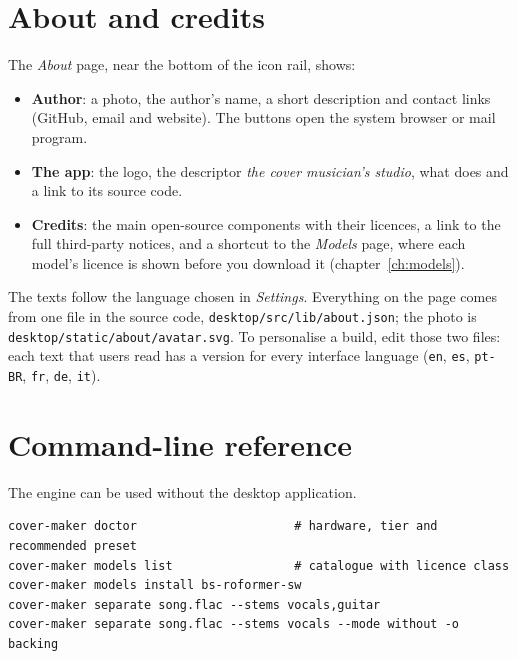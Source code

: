 \documentclass{covermaker}
\begin{document}
\chapter{About and credits}\label{ch:about}
The \emph{About} page, near the bottom of the icon rail, shows:
\begin{itemize}
  \item \textbf{Author}: a photo, the author's name, a short description and
  contact links (GitHub, email and website). The buttons open the system
  browser or mail program.
  \item \textbf{The app}: the logo, the descriptor \emph{the cover
  musician's studio}, what \CM{} does and a link to its source code.
  \item \textbf{Credits}: the main open-source components with their
  licences, a link to the full third-party notices, and a shortcut to the
  \emph{Models} page, where each model's licence is shown before you download
  it (chapter~\ref{ch:models}).
\end{itemize}

The texts follow the language chosen in \emph{Settings}. Everything on the page
comes from one file in the source code, \texttt{desktop/src/lib/about.json}; the
photo is \texttt{desktop/static/about/avatar.svg}. To personalise a build, edit
those two files: each text that users read has a version for every interface
language (\texttt{en}, \texttt{es}, \texttt{pt-BR}, \texttt{fr}, \texttt{de},
\texttt{it}).

\chapter{Command-line reference}
The engine can be used without the desktop application.

\begin{lstlisting}
cover-maker doctor                      # hardware, tier and recommended preset
cover-maker models list                 # catalogue with licence class
cover-maker models install bs-roformer-sw
cover-maker separate song.flac --stems vocals,guitar
cover-maker separate song.flac --stems vocals --mode without -o backing
\end{lstlisting}
\end{document}
